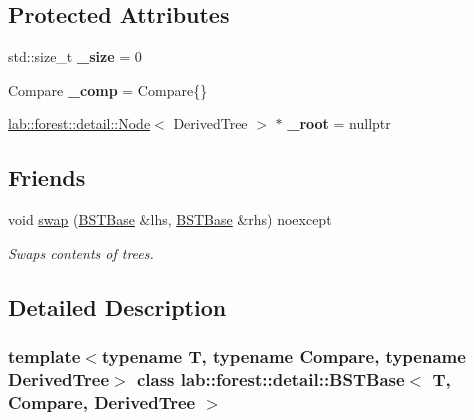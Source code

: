 \subsection*{Protected Attributes}
\begin{DoxyCompactItemize}
\item 
\mbox{\label{classlab_1_1forest_1_1detail_1_1BSTBase_af2d79489ceab33ecfa6a6c90df7bd12f}} 
std\+::size\+\_\+t {\bfseries \+\_\+size} = 0
\item 
\mbox{\label{classlab_1_1forest_1_1detail_1_1BSTBase_ac956fd4baf6a5a055f2eebea66aebafb}} 
Compare {\bfseries \+\_\+comp} = Compare\{\}
\item 
\mbox{\label{classlab_1_1forest_1_1detail_1_1BSTBase_acf863c0027cb1d90ac099917f5a988d4}} 
\hyperlink{structlab_1_1forest_1_1detail_1_1Node}{lab\+::forest\+::detail\+::\+Node}$<$ Derived\+Tree $>$ $\ast$ {\bfseries \+\_\+root} = nullptr
\end{DoxyCompactItemize}
\subsection*{Friends}
\begin{DoxyCompactItemize}
\item 
\mbox{\label{classlab_1_1forest_1_1detail_1_1BSTBase_ad7b611157b688b63c666ce6caecd6e0b}} 
void \hyperlink{classlab_1_1forest_1_1detail_1_1BSTBase_ad7b611157b688b63c666ce6caecd6e0b}{swap} (\hyperlink{classlab_1_1forest_1_1detail_1_1BSTBase}{B\+S\+T\+Base} \&lhs, \hyperlink{classlab_1_1forest_1_1detail_1_1BSTBase}{B\+S\+T\+Base} \&rhs) noexcept
\begin{DoxyCompactList}\small\item\em Swaps contents of trees. \end{DoxyCompactList}\end{DoxyCompactItemize}


\subsection{Detailed Description}
\subsubsection*{template$<$typename T, typename Compare, typename Derived\+Tree$>$\newline
class lab\+::forest\+::detail\+::\+B\+S\+T\+Base$<$ T, Compare, Derived\+Tree $>$}

